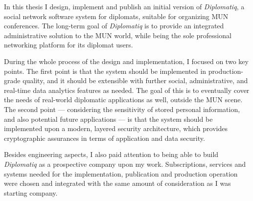In this thesis I design, implement and publish an initial version of \emph{Diplomatiq}, a social network software system for diplomats, suitable for organizing MUN conferences. The long-term goal of \emph{Diplomatiq} is to provide an integrated administrative solution to the MUN world, while being the sole professional networking platform for its diplomat users.

During the whole process of the design and implementation, I focused on two key points. The first point is that the system should be implemented in production-grade quality, and it should be extensible with further social, administrative, and real-time data analytics features as needed. The goal of this is to eventually cover the needs of real-world diplomatic applications as well, outside the MUN scene. The second point — considering the sensitivity of stored personal information, and also potential future applications — is that the system should be implemented upon a modern, layered security architecture, which provides cryptographic assurances in terms of application and data security.

Besides engineering aspects, I also paid attention to being able to build \emph{Diplomatiq} as a prospective company upon my work. Subscriptions, services and systems needed for the implementation, publication and production operation were chosen and integrated with the same amount of consideration as I was starting company.

